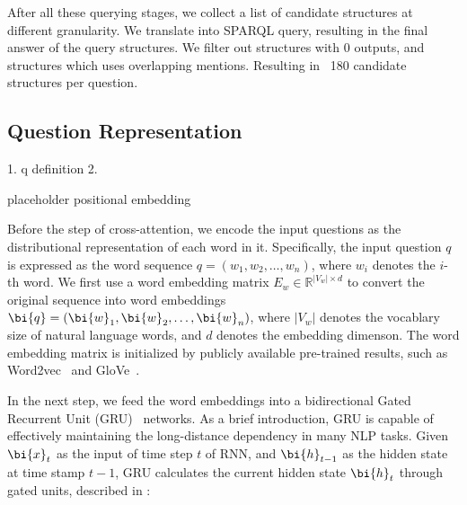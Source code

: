 After all these querying stages, we collect a list of candidate structures at different granularity.
We translate into SPARQL query, resulting in the final answer of the query structures.
We filter out structures with 0 outputs, and structures which uses overlapping mentions.
Resulting in ~180 candidate structures per question.





\subsection{Question Representation}
\label{sec:q-encoding}


1. q definition
2. 

placeholder
positional embedding

Before the step of cross-attention, we encode the input questions as the distributional
representation of each word in it.
Specifically, the input question $q$ is expressed as the word sequence $q=(w_1, w_2, \dots, w_n)$,
where $w_i$ denotes the $i$-th word.
We first use a word embedding matrix $E_w \in \mathbb{R}^{|V_w| \times d}$ to convert 
the original sequence into word embeddings $\bi{q}=(\bi{w}_1, \bi{w}_2, \dots, \bi{w}_n)$,
where $|V_w|$ denotes the vocablary size of natural language words,
and $d$ denotes the embedding dimenson.
The word embedding matrix is initialized by publicly available pre-trained results, 
such as Word2vec~\cite{mikolov2013} and GloVe~\cite{xxx}. 

In the next step, we feed the word embeddings into a bidirectional Gated Recurrent Unit (GRU)~\cite{xxx} networks.
As a brief introduction, GRU is capable of effectively maintaining the long-distance dependency in many NLP tasks.
Given $\bi{x}_t$ as the input of time step $t$ of RNN, and $\bi{h}_{t-1}$ as the hidden state at time stamp $t-1$,
GRU calculates the current hidden state $\bi{h}_t$ through gated units, described in :

